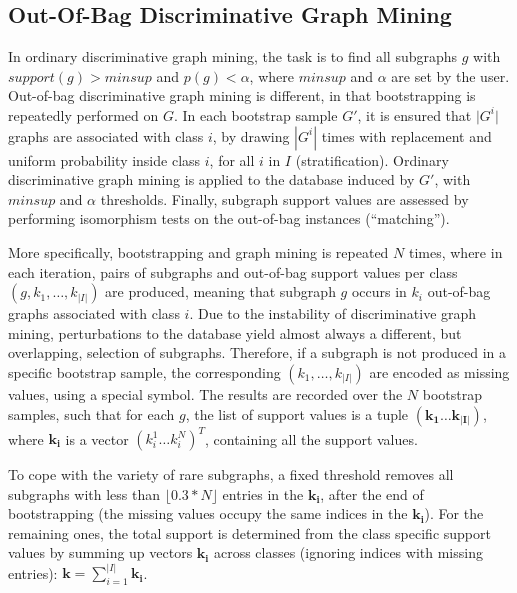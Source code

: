 \documentclass{sig-alternate}
\begin{document}
\subsection{Out-Of-Bag Discriminative Graph Mining}
\label{ss:oob-dgm}
In ordinary discriminative graph mining, the task is to find all subgraphs
$g$ with $support(g)>minsup$ and $p(g)<\alpha$, where $minsup$ and $\alpha$ are
set by the user.
Out-of-bag discriminative graph mining is different, in that bootstrapping is repeatedly performed on $G$.
In each bootstrap sample $G'$, it is ensured that $\vert G^i\vert$ graphs are associated with
class $i$, by drawing $|G^i|$ times with replacement and uniform probability inside 
class $i$, for all $i$ in $I$ (stratification). 
Ordinary discriminative graph mining is applied to the database induced by $G'$, with $minsup$ and $\alpha$ thresholds. 
Finally, subgraph support values are assessed by performing isomorphism
tests on the out-of-bag instances (``matching'').

More specifically, bootstrapping and graph mining is repeated $N$ times, where in each
iteration, pairs of subgraphs and out-of-bag support values per class
$(g,k_1,\ldots,k_{\vert I\vert})$ are produced, meaning that subgraph $g$
occurs in $k_i$ out-of-bag graphs associated with class $i$. 
Due to the instability of discriminative graph mining, perturbations to the database yield almost
always a different, but overlapping, selection of subgraphs. 
Therefore, if a subgraph is not produced in a specific bootstrap sample, the corresponding
$(k_1,\ldots,k_{\vert I\vert})$ are encoded as missing values, using a special symbol.
The results are
recorded over the $N$ bootstrap samples, such that for each $g$, the list of
support values is a tuple $(\mathbf{k_1}\ldots\mathbf{k_{\vert I\vert}})$,
where $\mathbf{k_i}$ is a vector $(k_i^1\ldots k_i^N)^T$, containing all the
support values. 

To cope with the
variety of rare subgraphs, a fixed threshold removes all subgraphs with less
than $\lfloor0.3*N\rfloor$ entries in the $\mathbf{k_i}$, after the end
of bootstrapping (the missing values occupy the same indices in the $\mathbf{k_i}$).
For the remaining ones, the total support is determined from the class specific support values by
summing up vectors $\mathbf{k_i}$ across classes (ignoring indices with missing entries):
$\mathbf{k}=\sum_{i=1}^{\vert I\vert} \mathbf{k_i}$. 
\end{document}
